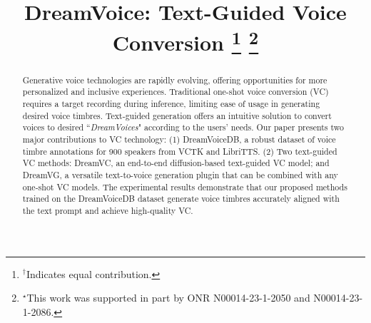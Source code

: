 \documentclass{Interspeech2024}
\title{DreamVoice: Text-Guided Voice Conversion
\thanks{$^{\dagger}$Indicates equal contribution.}
\thanks{$^{\star}$This work was supported in part by ONR N00014-23-1-2050 and N00014-23- 1-2086.}
}
\begin{document}
\maketitle

\begin{abstract}
Generative voice technologies are rapidly evolving, offering opportunities for more personalized and inclusive experiences. Traditional one-shot voice conversion (VC) requires a target recording during inference, limiting ease of usage in generating desired voice timbres. Text-guided generation offers an intuitive solution to convert voices to desired ``\textit{DreamVoices}" according to the users' needs. Our paper presents two major contributions to VC technology: (1) DreamVoiceDB, a robust dataset of voice timbre annotations for 900 speakers from VCTK and LibriTTS. (2) Two text-guided VC methods: DreamVC, an end-to-end diffusion-based text-guided VC model; and DreamVG, a versatile text-to-voice generation plugin that can be combined with any one-shot VC models. The experimental results demonstrate that our proposed methods trained on the DreamVoiceDB dataset generate voice timbres accurately aligned with the text prompt and achieve high-quality VC.

\end{abstract}
\end{document}
